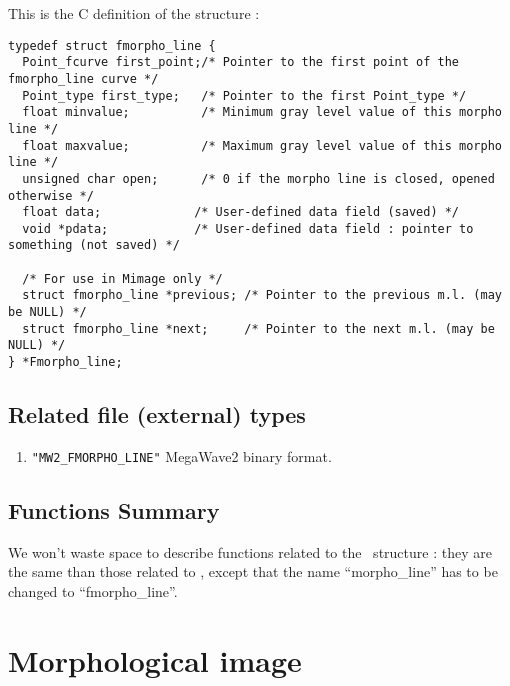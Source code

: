 This is the C definition of the structure \fmline:
{\small
\begin{verbatim}
typedef struct fmorpho_line {
  Point_fcurve first_point;/* Pointer to the first point of the fmorpho_line curve */
  Point_type first_type;   /* Pointer to the first Point_type */
  float minvalue;          /* Minimum gray level value of this morpho line */
  float maxvalue;          /* Maximum gray level value of this morpho line */
  unsigned char open;      /* 0 if the morpho line is closed, opened otherwise */
  float data;             /* User-defined data field (saved) */
  void *pdata;            /* User-defined data field : pointer to something (not saved) */
 
  /* For use in Mimage only */
  struct fmorpho_line *previous; /* Pointer to the previous m.l. (may be NULL) */
  struct fmorpho_line *next;     /* Pointer to the next m.l. (may be NULL) */
} *Fmorpho_line;
\end{verbatim}
}

\subsection{Related file (external) types}
\label{fmline-file_type}

\begin{enumerate}
\item \verb+"MW2_FMORPHO_LINE"+ MegaWave2 binary format.
\end{enumerate}

\subsection{Functions Summary}
\label{fmline-function}

We won't waste space to describe functions related to the \fmline\ structure : they
are the same than those related to \mline, except that the name ``morpho\_line'' has
to be changed to ``fmorpho\_line''.

\section{Morphological image}


